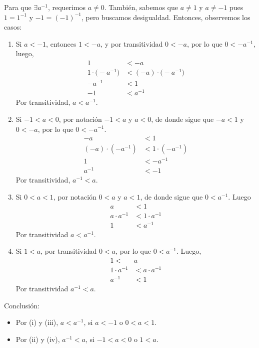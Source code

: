 \documentclass[11pt]{article}
\begin{document}
\begin{enumerate}[label=\alph*)]
    Para que $\exists a^{-1}$, requerimos $a\neq 0$. También, sabemos que $a\neq 1$ y $a\neq -1$ pues $1=1^{-1}$ y $-1=(-1)^{-1}$, pero buscamos desigualdad. Entonces, observemos los casos: \begin{enumerate}[label=\roman*)]
        \item Si $a<-1$, entonces $1<-a$, y por transitividad $0<-a$, por lo que $0<-a^{-1}$, luego, \begin{align*}
            1 &< -a \\
            1\cdot \bigl(-a^{-1}\bigr) &< (-a) \cdot \bigl(-a^{-1}\bigr) \\
            -a^{-1} &< 1\\
            -1 &< a^{-1}
        \end{align*} Por transitividad, $a < a^{-1}$.
        \item Si $-1<a<0$, por notación $-1<a$ y $a<0$, de donde sigue que $-a<1$ y $0<-a$, por lo que $0<-a^{-1}$. \begin{align*}
            -a &< 1 \\
            (-a) \cdot (-a^{-1}) &< 1\cdot (-a^{-1})\\
            1 &< -a^{-1}\\
            a^{-1} &< -1
        \end{align*} Por transitividad, $a^{-1}<a$.
        \item Si $0<a<1$, por notación $0<a$ y $a<1$, de donde sigue que $0<a^{-1}$. Luego \begin{align*}
            a &< 1 \\
            a\cdot a^{-1} &< 1 \cdot a^{-1}\\
            1 &< a^{-1}
        \end{align*} Por transitividad $a<a^{-1}$.
        \item Si $1<a$, por transitividad $0<a$, por lo que $0<a^{-1}$. Luego, \begin{align*}
            1 <& a\\
            1 \cdot a^{-1} &< a \cdot a^{-1}\\
            a^{-1} &< 1
        \end{align*} Por transitividad $a^{-1}<a$.
    \end{enumerate}
    Conclusión: \begin{itemize}
        \item Por (i) y (iii), $a<a^{-1}$, si $a<-1$ o $0<a<1$.
        \item Por (ii) y (iv), $a^{-1}<a$, si $-1<a<0$ o $1<a$.
    \end{itemize}


\end{enumerate}
\end{document}
